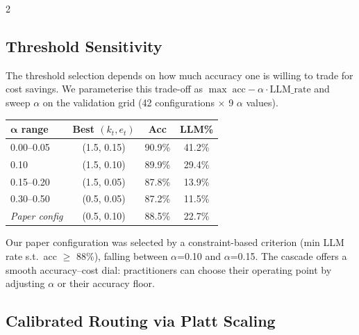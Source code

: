 \documentclass[11pt,a4paper]{article}
\begin{document}
\begin{multicols}{2}

\subsection{Threshold Sensitivity}
\label{sec:sensitivity}

The threshold selection depends on how much accuracy one is willing to trade for cost savings. We parameterise this trade-off as $\max\; \text{acc} - \alpha \cdot \text{LLM\_rate}$ and sweep $\alpha$ on the validation grid (42 configurations $\times$ 9 $\alpha$ values).

\begin{center}
\small
{}
\label{tab:pareto}
\begin{tabular}{@{}lccc@{}}
\toprule
$\boldsymbol{\alpha}$ \textbf{range} & \textbf{Best $(k_t, e_t)$} & \textbf{Acc} & \textbf{LLM\%} \\
\midrule
0.00--0.05 & (1.5, 0.15) & 90.9\% & 41.2\% \\
0.10 & (1.5, 0.10) & 89.9\% & 29.4\% \\
0.15--0.20 & (1.5, 0.05) & 87.8\% & 13.9\% \\
0.30--0.50 & (0.5, 0.05) & 87.2\% & 11.5\% \\
\midrule
\textit{Paper config} & (0.5, 0.10) & 88.5\% & 22.7\% \\
\bottomrule
\end{tabular}
\end{center}

Our paper configuration was selected by a constraint-based criterion (min LLM rate s.t.\ acc $\geq$ 88\%), falling between $\alpha$=0.10 and $\alpha$=0.15. The cascade offers a smooth accuracy--cost dial: practitioners can choose their operating point by adjusting $\alpha$ or their accuracy floor.

\subsection{Calibrated Routing via Platt Scaling}
\label{sec:calibrated}


\end{multicols}
\end{document}
